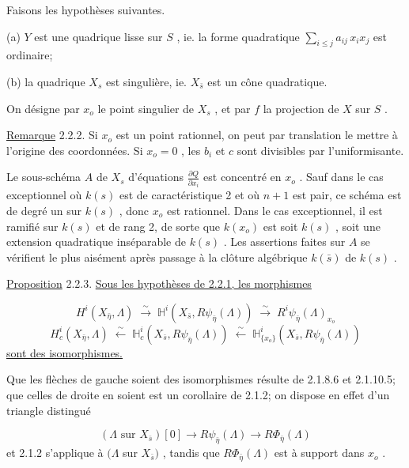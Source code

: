 Faisons les hypothèses suivantes.

(a) $Y$ est une quadrique lisse sur $S$ , ie. la forme quadratique $\sum_{i \leq j} a_{ij}\, x_i x_j$ est ordinaire;

(b) la quadrique $X_s$ est singulière, ie. $X_{\bar{s}}$ est un cône quadratique.

On désigne par $x_o$ le point singulier de $X_s$ , et par $f$ la projection de $X$ sur $S$ .

\underline{Remarque} 2.2.2. Si $x_o$ est un point rationnel, on peut par translation le mettre à l'origine des coordonnées. Si $x_o = 0$ , les $b_i$ et $c$ sont divisibles par l'uniformisante.

Le sous-schéma $A$ de $X_s$ d'équations $\frac{\partial Q}{\partial x_i}$ est concentré en $x_o$ . Sauf dans le cas exceptionnel où $k(s)$ est de caractéristique 2 et où $n+1$ est pair, ce schéma est de degré un sur $k(s)$ , donc $x_o$ est rationnel. Dans le cas exceptionnel, il est ramifié sur $k(s)$ et de rang 2, de sorte que $k(x_o)$ est soit $k(s)$ , soit une extension quadratique inséparable de $k(s)$ . Les assertions faites sur $A$ se vérifient le plus aisément après passage à la clôture algébrique $k(\bar{s})$ de $k(s)$ .

\underline{Proposition} 2.2.3. \underline{Sous les hypothèses de 2.2.1, les morphismes} 



\begin{equation*}
 H^i(X_{\bar{\eta}} , \Lambda) \;\stackrel{\sim}{\longrightarrow}\; \mathbb{H}^i(X_{\bar{s}}, R\psi_{\bar{\eta}} (\Lambda)) \;\stackrel{\sim}{\longrightarrow}\; R^i\psi_{\bar{\eta}}(\Lambda)_{x_o}
\end{equation*}
\begin{equation*}
H_c^i(X_{\bar{\eta}} , \Lambda) \;\stackrel{\sim}{\longleftarrow}\; \mathbb{H}_c^i(X_{\bar{s}}, R\psi_{\bar{\eta}} (\Lambda)) \;\stackrel{\sim}{\longleftarrow}\; \mathbb{H}^i_{\{x_o\}}(X_{\bar{s}}, R\psi_{\bar{\eta}}(\Lambda))
\end{equation*}
\underline{sont des isomorphismes.}

Que les flèches de gauche soient des isomorphismes résulte de 2.1.8.6 et 2.1.10.5; que celles de droite en soient est un corollaire de 2.1.2; on dispose en effet d'un triangle distingué

\begin{equation*}
(\Lambda \mbox{ sur } X_{\bar{s}})[0] \longrightarrow R\psi_{\bar{\eta}}(\Lambda) \longrightarrow R\Phi_{\bar{\eta}}(\Lambda)
\end{equation*}
et 2.1.2 s'applique à $(\Lambda$ sur $X_{\bar{s}})$ , tandis que $R\Phi_{\bar{\eta}}(\Lambda)$ est à support dans $x_o$ .

